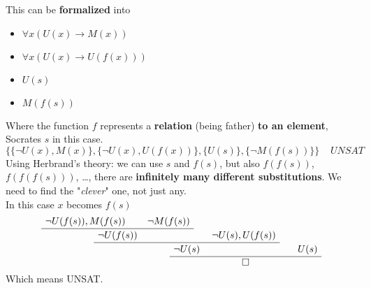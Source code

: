 This can be \textbf{formalized} into
\begin{itemize}
	\item $\forall x (U(x) \rightarrow M(x))$
	\item $\forall x (U(x) \rightarrow U(f(x)))$
	\item $U(s)$
	\\ \bline
	\item $M(f(s))$
\end{itemize}
Where the function $f$ represents a \textbf{relation} (being father) \textbf{to an element}, Socrates $s$ in this case.\\

$$ 
\{ \{\neg U(x), M(x)\}, \{\neg U(x), U(f(x))\}, \{U(s)\}, \{\neg M(f(s))\}\} \;\;\;\; UNSAT $$
Using Herbrand's theory: we can use $s$ and $f(s)$, but also $f(f(s))$, $f(f(f(s)))$, \dots, there are \textbf{infinitely many different substitutions}. We need to find the "\textit{clever}" one, not just any.\\

In this case $x$ becomes $f(s)$
$$
\AxiomC{$\neg U(f(s)), M(f(s))$}
\AxiomC{$\neg M(f(s))$}
\BinaryInfC{$\neg U(f(s))$}
\AxiomC{$\neg U(s), U(f(s))$}
\BinaryInfC{$\neg U(s)$}
\AxiomC{$U(s)$}
\BinaryInfC{$\square$}
\DisplayProof
$$
Which means UNSAT.\\

